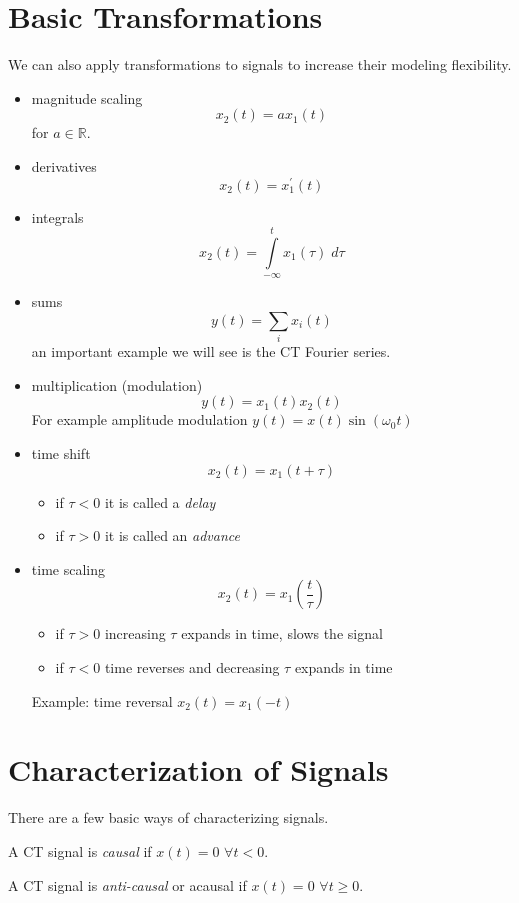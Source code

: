 \section{Basic Transformations}

We can also apply transformations to signals to increase their modeling flexibility.
  
\begin{itemize}
\item  magnitude scaling
  \[
  x_2(t) = a x_1(t)
  \]
  for $a \in \mathbb{R}$.
\item derivatives
  \[
  x_2(t) = x_1^\prime(t)
  \]
\item integrals
  \[
  x_2(t) = \int\limits_{-\infty}^t x_1(\tau) \; d\tau
  \]
\item sums
  \[
  y(t) = \sum\limits_{i} x_i(t)
  \]
  an important example we will see is the CT Fourier series.  
\item multiplication (modulation)
  \[
  y(t) = x_1(t) x_2(t)
  \]
  For example amplitude modulation $y(t) = x(t)\sin(\omega_0 t)$
\item time shift
  \[
  x_2(t) = x_1(t+\tau)
  \]
  \begin{itemize}
  \item if $\tau <0$ it is called a {\it delay}
  \item if $\tau >0$ it is called an {\it advance}
  \end{itemize}
  \item time scaling
    \[
    x_2(t) = x_1\left(\frac{t}{\tau}\right)
    \]
    \begin{itemize}
    \item if $\tau >0$ increasing $\tau$ expands in time, slows the signal
    \item if $\tau <0$ time reverses and decreasing $\tau$ expands in time
    \end{itemize}
    Example: time reversal $ x_2(t) = x_1(-t)$
\end{itemize}

\section{Characterization of Signals}

There are a few basic ways of characterizing signals.

\begin{definition}
  A CT signal is \emph{causal} if $x(t) = 0$ $\forall t < 0$.
\end{definition}
\begin{definition}
  A CT signal is \emph{anti-causal} or acausal if $x(t) = 0$ $\forall t \geq 0$.
\end{definition}

